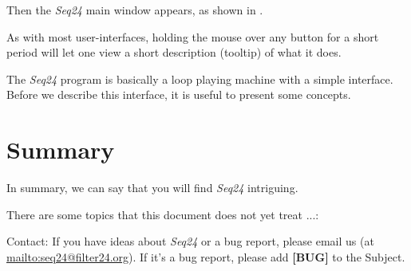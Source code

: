 \documentclass[
 11pt,
 twoside,
 a4paper,
 headinclude,
 footinclude,
 final                                 %
]{article}
\begin{document}
   Then the \textsl{Seq24} main window appears, as shown in
   .

   As with most user-interfaces, holding the mouse over any button for a
   short period will let one view a short description (tooltip)
   of what it does.

   The \textsl{Seq24} program is basically a loop playing machine with a 
   simple interface.  Before we describe this interface, it is useful to
   present some concepts.


























% 

\section{Summary}
\label{sec:summary}

   In summary, we can say that you will find \textsl{Seq24} intriguing.

   There are some topics that this document does not yet treat ...:

   Contact: If you have ideas about \textsl{Seq24} or a bug report, please
   email us (at \url{mailto:seq24@filter24.org}).
   If it's a bug report, please add \textbf{[BUG]} to the Subject.




\printindex
\end{document}
